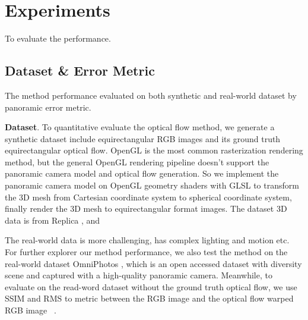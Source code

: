 \section{Experiments}
\label{sec:exp}

To evaluate the performance.


\subsection{Dataset \& Error Metric}

The method performance evaluated on both synthetic and real-world dataset by panoramic error metric.

\textbf{Dataset}.
%
To quantitative evaluate the optical flow method, we generate a synthetic dataset include equirectangular RGB images and its ground truth equirectangular optical flow.
OpenGL is the most common rasterization rendering method, but the general OpenGL rendering pipeline doesn't support the panoramic camera model and optical flow generation.
So we implement the panoramic camera model on OpenGL geometry shaders with GLSL to transform the 3D mesh from Cartesian coordinate system to spherical coordinate system, finally render the 3D mesh to equirectangular format images.
The dataset 3D data is from Replica \cite{StrauWMCWGEMRVCYBYPYZLCBGMPSBSNGLN2019}, and 

The real-world data is more challenging, has complex lighting and motion etc. 
For further explorer our method performance,  we also test the method on the real-world dataset OmniPhotos \cite{BerteYLR2020}, which is an open accessed dataset with diversity scene and captured with a high-quality panoramic camera.
Meanwhile, to evaluate on the read-word dataset without the ground truth optical flow, we use SSIM and RMS to metric between the RGB image and the optical flow warped RGB image ~\cite{???}.

